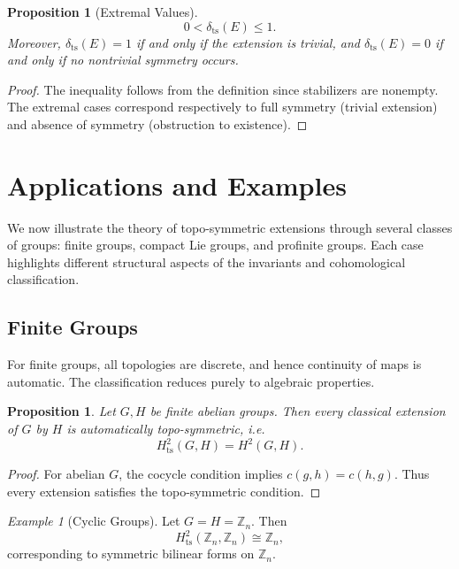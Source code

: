 \documentclass[11pt,a4paper]{article}
\theoremstyle{plain}
\newtheorem{proposition}[theorem]{Proposition}
\theoremstyle{definition}
\theoremstyle{remark}
\newtheorem{example}[theorem]{Example}
\begin{document}
	\begin{proposition}[Extremal Values]
		\[
		0 < \delta_{\mathrm{ts}}(E) \leq 1.
		\]
		Moreover, $\delta_{\mathrm{ts}}(E) = 1$ if and only if the extension is trivial, and $\delta_{\mathrm{ts}}(E) = 0$ if and only if no nontrivial symmetry occurs.
	\end{proposition}
	
	\begin{proof}
		The inequality follows from the definition since stabilizers are nonempty.  
		The extremal cases correspond respectively to full symmetry (trivial extension) and absence of symmetry (obstruction to existence).  
	\end{proof}
	
	\section{Applications and Examples}
	
	We now illustrate the theory of topo-symmetric extensions through several classes of groups: finite groups, compact Lie groups, and profinite groups.  
	Each case highlights different structural aspects of the invariants and cohomological classification.
	
	\subsection{Finite Groups}
	
	For finite groups, all topologies are discrete, and hence continuity of maps is automatic.  
	The classification reduces purely to algebraic properties.
	
	\begin{proposition}
		Let $G,H$ be finite abelian groups.  
		Then every classical extension of $G$ by $H$ is automatically topo-symmetric, i.e.
		\[
		H^2_{\mathrm{ts}}(G,H) = H^2(G,H).
		\]
	\end{proposition}
	
	\begin{proof}
		For abelian $G$, the cocycle condition implies $c(g,h)=c(h,g)$.  
		Thus every extension satisfies the topo-symmetric condition.  
	\end{proof}
	
	\begin{example}[Cyclic Groups]
		Let $G=H=\mathbb{Z}_n$.  
		Then
		\[
		H^2_{\mathrm{ts}}(\mathbb{Z}_n,\mathbb{Z}_n) \cong \mathbb{Z}_n,
		\]
		corresponding to symmetric bilinear forms on $\mathbb{Z}_n$.  
	\end{example}
	
\end{document}
